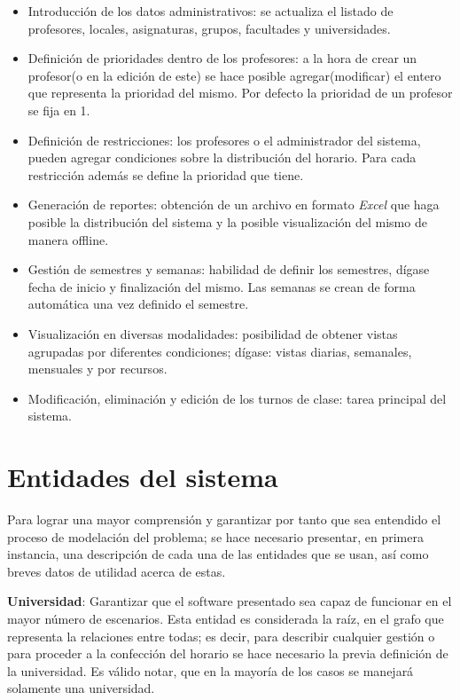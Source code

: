 \begin{itemize}
	\item Introducción de los datos administrativos: se actualiza el listado de profesores, locales, asignaturas, grupos, facultades y universidades.
	\item Definición de prioridades dentro de los profesores: a la hora de crear un profesor(o en la edición de este) se hace posible agregar(modificar) el entero que representa la prioridad del mismo. Por defecto la prioridad de un profesor se fija en 1.
	\item Definición de restricciones: los profesores o el administrador del sistema, pueden agregar condiciones sobre la distribución del horario. Para cada restricción además se define la prioridad que tiene. 
	\item Generación de reportes: obtención de un archivo en formato \textit{Excel} que haga posible la distribución del sistema y la posible visualización del mismo de manera offline.
	\item Gestión de semestres y semanas: habilidad de definir los semestres, dígase fecha de inicio y finalización del mismo. Las semanas se crean de forma automática una vez definido el semestre.
	\item Visualización en diversas modalidades: posibilidad de obtener vistas agrupadas por diferentes condiciones; dígase: vistas diarias, semanales, mensuales y por recursos.
	\item Modificación, eliminación y edición de los turnos de clase: tarea principal del sistema.
\end{itemize}

\section{Entidades del sistema}
\label{sec:entities}

Para lograr una mayor comprensión y garantizar por tanto que sea entendido el proceso de modelación del problema; se hace necesario presentar, en primera instancia, una descripción de cada una de las entidades que se usan, así como breves datos de utilidad acerca de estas.

\textbf{Universidad}: Garantizar que el software presentado sea capaz de funcionar en el mayor número de escenarios. Esta entidad es considerada la raíz, en el grafo que representa la relaciones entre todas; es decir, para describir cualquier gestión o para proceder a la confección del horario se hace necesario la previa definición de la universidad. Es válido notar, que en la mayoría de los casos se manejará solamente  una universidad.

